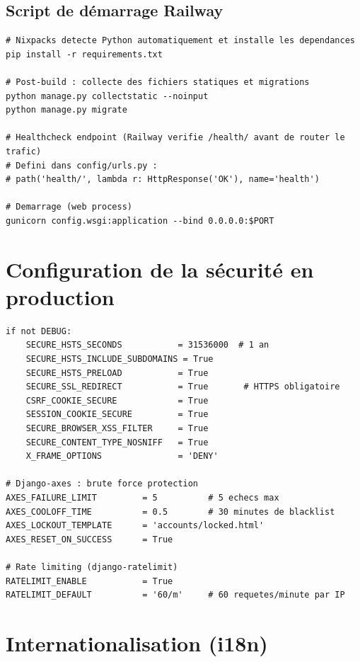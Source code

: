 \documentclass[12pt,a4paper,twoside]{report}
\begin{document}
\subsection{Script de démarrage Railway}

\begin{lstlisting}[style=bashstyle, caption={Séquence de démarrage Railway (Nixpacks)}]
# Nixpacks detecte Python automatiquement et installe les dependances
pip install -r requirements.txt

# Post-build : collecte des fichiers statiques et migrations
python manage.py collectstatic --noinput
python manage.py migrate

# Healthcheck endpoint (Railway verifie /health/ avant de router le trafic)
# Defini dans config/urls.py :
# path('health/', lambda r: HttpResponse('OK'), name='health')

# Demarrage (web process)
gunicorn config.wsgi:application --bind 0.0.0.0:$PORT
\end{lstlisting}

\section{Configuration de la sécurité en production}

\begin{lstlisting}[style=pythonstyle, caption={Paramètres de sécurité production (\texttt{settings.py})}]
if not DEBUG:
    SECURE_HSTS_SECONDS           = 31536000  # 1 an
    SECURE_HSTS_INCLUDE_SUBDOMAINS = True
    SECURE_HSTS_PRELOAD           = True
    SECURE_SSL_REDIRECT           = True       # HTTPS obligatoire
    CSRF_COOKIE_SECURE            = True
    SESSION_COOKIE_SECURE         = True
    SECURE_BROWSER_XSS_FILTER     = True
    SECURE_CONTENT_TYPE_NOSNIFF   = True
    X_FRAME_OPTIONS               = 'DENY'

# Django-axes : brute force protection
AXES_FAILURE_LIMIT         = 5          # 5 echecs max
AXES_COOLOFF_TIME          = 0.5        # 30 minutes de blacklist
AXES_LOCKOUT_TEMPLATE      = 'accounts/locked.html'
AXES_RESET_ON_SUCCESS      = True

# Rate limiting (django-ratelimit)
RATELIMIT_ENABLE           = True
RATELIMIT_DEFAULT          = '60/m'     # 60 requetes/minute par IP
\end{lstlisting}

\section{Internationalisation (i18n)}
\end{document}
